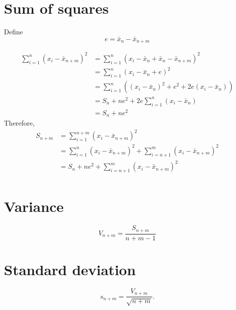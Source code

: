 \documentclass[12pt]{article}
\begin{document}
\section{Sum of squares}
Define
\begin{equation}
e = \bar{x}_n  - \bar{x}_{n+m}
\end{equation}

\begin{align}
 \sum_{i=1}^{n} (x_i - \bar{x}_{n+m})^2 
&=  \sum_{i=1}^{n} (x_i -
 \bar{x}_n + \bar{x}_n  - \bar{x}_{n+m})^2  \\
&=  \sum_{i=1}^{n} (x_i -
 \bar{x}_n +e)^2  \\
&= \sum_{i=1}^{n} ((x_i-\bar{x}_n)^2 + e^2 + 2e (x_i-\bar{x}_n)) \\
&= S_n + ne^2 + 2e\sum_{i=1}^{n} (x_i -\bar{x}_n) \\
&= S_n + ne^2
\end{align}
Therefore,
\begin{align}
S_{n+m} &= \sum_{i=1}^{n+m} (x_i - \bar{x}_{n+m})^2 \\
  &= \sum_{i=1}^{n} (x_i - \bar{x}_{n+m})^2 + \sum_{i=n+1}^{m} (x_i -    \bar{x}_{n+m})^2 \\
 &= S_n + ne^2 + \sum_{i=n+1}^{m} (x_i - \bar{x}_{n+m})^2 \\
\end{align}
\section{Variance}
\begin{equation}
  V_{n+m} = \frac{S_{n+m}}{n+m-1} 
\end{equation}
\section{Standard deviation}
\begin{equation}
s_{n+m} = \frac{V_{n+m}}{\sqrt{n+m}}.
\end{equation}
\end{document}

